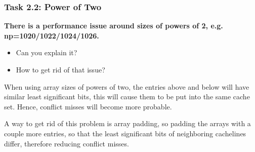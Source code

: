 \begin{frame}[fragile]
\frametitle{Task 2.2: Power of Two}

\textbf{ There is a performance issue around sizes of powers of 2, e.g. np=1020/1022/1024/1026.}
\begin {itemize}
\item Can you explain it? 
\item How to get rid of that issue?
\end {itemize}

When using array sizes of powers of two, the entries above and below will have similar least significant bits, this will cause them to be put into the same cache set. Hence, conflict misses will become more probable.

A way to get rid of this problem is array padding, so padding the arrays with a couple more entries, so that the least significant bits of neighboring cachelines differ, therefore reducing conflict misses.


\end{frame}
